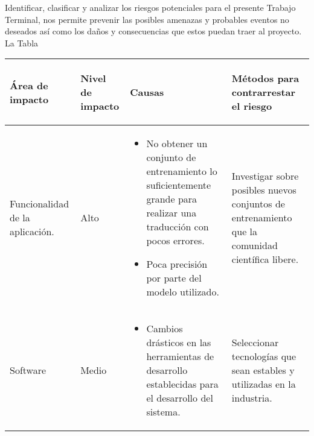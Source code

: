 Identificar, clasificar y analizar los riesgos potenciales para el presente Trabajo Terminal, nos permite prevenir las posibles amenazas y probables eventos no deseados así como los daños y consecuencias que estos puedan traer al proyecto. La Tabla 

\begin{center}
    \begin{longtable}{|J{2.5cm}|J{2cm}|J{5cm}|J{5cm}|}
    
        \hline
        \begin{center}
            \textbf{Área de impacto}
        \end{center}                &
        \begin{center}
            \textbf{Nivel de impacto}
        \end{center}                &
        \begin{center}
            \textbf{Causas} 
        \end{center}                &
        \begin{center}
            \textbf{Métodos para contrarrestar el riesgo}
        \end{center} \\ 
        
        \hline
        Funcionalidad de la aplicación.         &
        \begin{center}
            Alto
        \end{center}                            &
        \begin{itemize}
            \item No obtener un conjunto de entrenamiento lo suficientemente grande para realizar una traducción con pocos errores.
            \item Poca precisión por parte del modelo utilizado.
        \end{itemize}                           &
        Investigar sobre posibles nuevos conjuntos de entrenamiento que la comunidad científica libere. \\
        
        \hline
        Software                                &
        \begin{center}
            Medio
        \end{center}                            &
        \begin{itemize}
            \item Cambios drásticos en las herramientas de desarrollo establecidas para el desarrollo del sistema.
        \end{itemize}                           &
        Seleccionar tecnologías que sean estables y utilizadas en la industria. \\
        

\end{longtable}
\end{center}
